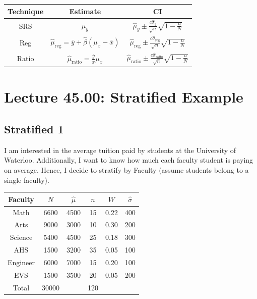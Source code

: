\documentclass[oneside]{book}\usepackage[]{graphicx}\usepackage[dvipsnames,table,xcdraw]{xcolor}
\begin{document}
\begin{table}[!htbp]
    \centering
    \begin{NiceTabular}{|c|c|c|}
        \toprule
        Technique &                               Estimate                               &                                                      CI\\
        \midrule
        SRS    &                            $\hat{\mu}_y$                             &              $\displaystyle\hat{\mu}_y\pm \frac{c\hat{\sigma}_y}{\sqrt{n}}\sqrt{1-\frac{n}{N}}$              \\
        Reg    &     $\hat{\mu}_{\text{reg}}=\bar{y}+\hat{\beta}(\mu_x-\bar{x})$      &   $\displaystyle\hat{\mu}_{\text{reg}}\pm \frac{c\hat{\sigma}_{\text{reg}}}{\sqrt{n}}\sqrt{1-\frac{n}{N}}$   \\
        Ratio   & $\hat{\mu}_{\text{ratio}}=\displaystyle\frac{\bar{y}}{\bar{x}}\mu_x$ & $\displaystyle\hat{\mu}_{\text{ratio}}\pm \frac{c\hat{\sigma}_{\text{ratio}}}{\sqrt{n}}\sqrt{1-\frac{n}{N}}$ \\
        \bottomrule
    \end{NiceTabular}
\end{table}






\section{Lecture 45.00: Stratified Example}
\subsection{Stratified 1}\label{stratified1}
I am interested in the average tuition paid by students
at the University of Waterloo. Additionally, I want
to know how much each faculty student is paying on average.
Hence, I decide to stratify by Faculty (assume students belong to a single faculty).
\begin{table}[!htbp]
    \centering
    \begin{NiceTabular}{|c|c|c|c|c|c|}
        \toprule
        Faculty & $ N $ & $ \hat{\mu} $ & $ n $ & $ W $ & $ \hat{\sigma} $\\
        \midrule
        Math   & 6600  &    4500     &  15   & 0.22  &      400       \\
        Arts   & 9000  &    3000     &  10   & 0.30  &      200       \\
        Science  & 5400  &    4500     &  25   & 0.18  &      300       \\
        AHS    & 1500  &    3200     &  35   & 0.05  &      100       \\
        Engineer & 6000  &    7000     &  15   & 0.20  &      100       \\
        EVS    & 1500  &    3500     &  20   & 0.05  &      200       \\
        Total   & 30000 &             &  120  \\
        \bottomrule
    \end{NiceTabular}
\end{table}
\end{document}
